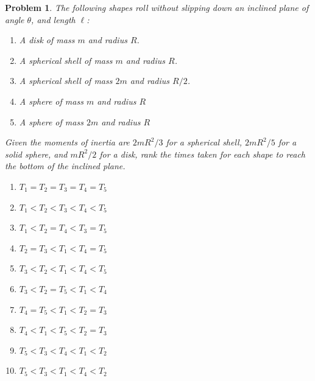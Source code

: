 \documentclass[12pt]{article}
\newcommand{\clearpts}{\addtocounter{tpts}{\value{cpts}} \setcounter{cpts}{0}}
\newcommand{\pts}[1]{\clearpts \setcounter{cpts}{#1}}
\theoremstyle{mystyle}
\newtheorem{pproblem}{Problem}
\begin{document}
\pts{2}
\begin{pproblem}
    The following shapes roll without slipping down an inclined plane of angle $\theta$,
    and length $\ell$:
    \begin{enumerate}[align=left]
        \item A disk of mass $m$ and radius $R$.
        \item A spherical shell of mass $m$ and radius $R$.
        \item A spherical shell of mass $2m$ and radius $R/2$.
        \item A sphere of mass $m$ and radius $R$
        \item A sphere of mass $2m$ and radius $R$
    \end{enumerate}
    Given the moments of inertia are $2mR^2/3$ for a spherical shell, 
    $2mR^2/5$ for a solid sphere, and $mR^2/2$ for a disk, rank the times taken for
    each shape to reach the bottom of the inclined plane.

    \begin{enumerate}[label=(\Alph*)]
        \item $T_1 = T_2 = T_3 = T_4 = T_5$
        \item $T_1 < T_2 < T_3 < T_4 < T_5$
        \item $T_1 < T_2 = T_4 < T_3 = T_5$
        \item $T_2 = T_3 < T_1 < T_4 = T_5$
        \item $T_3 < T_2 < T_1 < T_4 < T_5$
        \item $T_3 < T_2 = T_5 < T_1 < T_4$
        \item $T_4 = T_5 < T_1 < T_2 = T_3$
        \item $T_4 < T_1 < T_5 < T_2 = T_3$
        \item $T_5 < T_3 < T_4 < T_1 < T_2$
        \item $T_5 < T_3 < T_1 < T_4 < T_2$
    \end{enumerate}
\end{pproblem}
\end{document}
